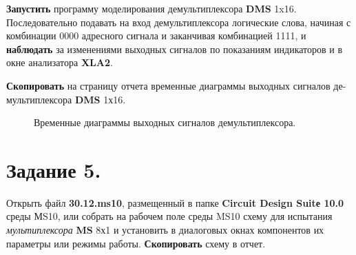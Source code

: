 \documentclass[spec, och, otchet, hidelinks]{SCWorks}
\begin{document}
\par \textbf{Запустить} программу моделирования демультиплексора \textbf{DMS} 1x16. Последовательно 
подавать на вход демультиплексора логические слова, начиная с комбинации 0000 адресного сигнала и 
заканчивая комбинацией 1111, и \textbf{наблюдать} за изменениями выходных сигналов по показаниям 
индикаторов и в окне анализатора \textbf{XLA2}.

\newpage

\par \textbf{Скопировать} на страницу отчета временные диаграммы выходных сигналов де-
мультиплексора \textbf{DMS} 1х16.

\begin{figure}[h]
	\caption{Временные диаграммы выходных сигналов демультиплексора.}
\end{figure}

\newpage

\section*{Задание 5.}

\par Открыть файл \textbf{30.12.ms10}, размещенный в папке \textbf{Circuit Design Suitе 10.0} среды МS10, 
или собрать на рабочем поле среды MS10 схему для испытания \textit{мультиплексора} \textbf{MS} 8х1 и 
установить в диалоговых окнах компонентов их параметры или режимы работы. \textbf{Скопировать} 
схему в отчет.
\end{document}
